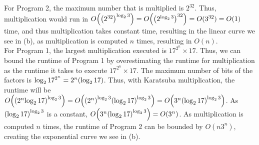 \documentclass[11pt]{scrartcl}
\theoremstyle{dotlessP}
\theoremstyle{dotlessN}
\DeclarePairedDelimiter\paren{(}{)} %
\begin{document}
\begin{enumerate}[(a)]
		For Program 2, the maximum number that is multiplied is  $2^{32}$. Thus, multiplication would run in  $O\paren*{\paren*{2^{32}}^{\log_2{3}}} = O\paren*{\paren*{2^{\log_2{3}}}^{32}} = O(3^{32}) = O(1)$ time, and thus multiplication takes constant time, resulting in the linear curve we see in (b), as multiplication is computed $n$ times, resulting in $O(n)$.
		\\

		For Program 1, the largest multiplication executed is $17^{2^n} \times 17$. Thus, we can bound the runtime of Program 1 by overestimating the runtime for multiplication as the runtime it takes to execute $17^{2^n} \times 17$. The maximum number of bits of the factors is $\log_2 {17^{2^n}} = 2^n \paren*{\log_2 17}$. Thus, with Karatsuba multiplication, the runtime will be $O\paren*{\paren*{2^n{\log_2 17}}^{\log_2 3}} = O\paren*{\paren*{2^n}^{\log_2 3}\paren*{\log_2 17}^{\log_2 3}} = O\paren*{3^n \paren*{\log_2 17}^{\log_2 3}}$. As $\paren*{\log_2 17}^{\log_2 3}$ is a constant,  $O\paren*{3^n \paren*{\log_2 17}^{\log_2 3}} = O(3^n)$. As multiplication is computed $n$ times, the runtime of Program 2 can be bounded by  $O(n 3^n)$, creating the exponential curve we see in (b).
\end{enumerate}
\end{document}
